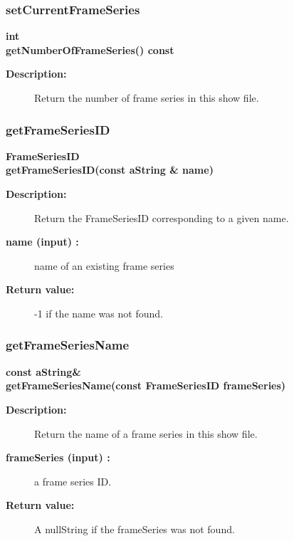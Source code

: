 \subsubsection{setCurrentFrameSeries}
 
\begin{flushleft} \textbf{%
int  \\ 
\settowidth{\OgshowIncludeArgIndent}{getNumberOfFrameSeries(}%
getNumberOfFrameSeries() const
}\end{flushleft}
\begin{description}
\item[{\bf Description:}] 
   Return the number of frame series in this show file.
\end{description}
\subsubsection{getFrameSeriesID}
 
\begin{flushleft} \textbf{%
FrameSeriesID  \\ 
\settowidth{\OgshowIncludeArgIndent}{getFrameSeriesID(}%
getFrameSeriesID(const aString \& name)
}\end{flushleft}
\begin{description}
\item[{\bf Description:}] 
   Return the FrameSeriesID corresponding to a given name.
\item[{\bf name (input) :}]  name of an existing frame series
\item[{\bf Return value:}]  -1 if the name was not found.
\end{description}
\subsubsection{getFrameSeriesName}
 
\begin{flushleft} \textbf{%
const aString\&  \\ 
\settowidth{\OgshowIncludeArgIndent}{getFrameSeriesName(}%
getFrameSeriesName(const FrameSeriesID frameSeries)
}\end{flushleft}
\begin{description}
\item[{\bf Description:}] 
   Return the name of a frame series in this show file.
 
\item[{\bf frameSeries (input) :}]  a frame series ID.
\item[{\bf Return value:}]  A nullString if the frameSeries was not found.
 
\end{description}
